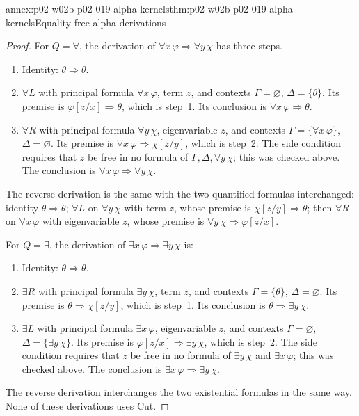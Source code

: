 \begin{annexitem}{annex:p02-w02b-p02-019-alpha-kernels}{thm:p02-w02b-p02-019-alpha-kernels}{Equality-free alpha derivations}
\begin{proof}
For \(Q=\forall\), the derivation of \(\forall x\,\varphi\Rightarrow\forall
y\,\chi\) has three steps.
\begin{enumerate}
 \item Identity: \(\theta\Rightarrow\theta\).
 \item \(\forall L\) with principal formula \(\forall x\,\varphi\), term
   \(z\), and contexts \(\Gamma=\varnothing\), \(\Delta=\{\theta\}\).  Its
   premise is \(\varphi[z/x]\Rightarrow\theta\), which is step~1.  Its
   conclusion is \(\forall x\,\varphi\Rightarrow\theta\).
 \item \(\forall R\) with principal formula \(\forall y\,\chi\),
   eigenvariable \(z\), and contexts \(\Gamma=\{\forall x\,\varphi\}\),
   \(\Delta=\varnothing\).  Its premise is
   \(\forall x\,\varphi\Rightarrow\chi[z/y]\), which is step~2.  The side
   condition requires that \(z\) be free in no formula of
   \(\Gamma,\Delta,\forall y\,\chi\); this was checked above.  The
   conclusion is \(\forall x\,\varphi\Rightarrow\forall y\,\chi\).
\end{enumerate}
The reverse derivation is the same with the two quantified formulas
interchanged: identity \(\theta\Rightarrow\theta\); \(\forall L\) on
\(\forall y\,\chi\) with term \(z\), whose premise is
\(\chi[z/y]\Rightarrow\theta\); then \(\forall R\) on \(\forall x\,\varphi\)
with eigenvariable \(z\), whose premise is
\(\forall y\,\chi\Rightarrow\varphi[z/x]\).

For \(Q=\exists\), the derivation of \(\exists x\,\varphi\Rightarrow\exists
y\,\chi\) is:
\begin{enumerate}
 \item Identity: \(\theta\Rightarrow\theta\).
 \item \(\exists R\) with principal formula \(\exists y\,\chi\), term \(z\),
   and contexts \(\Gamma=\{\theta\}\), \(\Delta=\varnothing\).  Its premise
   is \(\theta\Rightarrow\chi[z/y]\), which is step~1.  Its conclusion is
   \(\theta\Rightarrow\exists y\,\chi\).
 \item \(\exists L\) with principal formula \(\exists x\,\varphi\),
   eigenvariable \(z\), and contexts \(\Gamma=\varnothing\),
   \(\Delta=\{\exists y\,\chi\}\).  Its premise is
   \(\varphi[z/x]\Rightarrow\exists y\,\chi\), which is step~2.  The side
   condition requires that \(z\) be free in no formula of
   \(\exists y\,\chi\) and \(\exists x\,\varphi\); this was checked above.
   The conclusion is \(\exists x\,\varphi\Rightarrow\exists y\,\chi\).
\end{enumerate}
The reverse derivation interchanges the two existential formulas in the same
way.  None of these derivations uses Cut.


\end{proof}
\end{annexitem}
